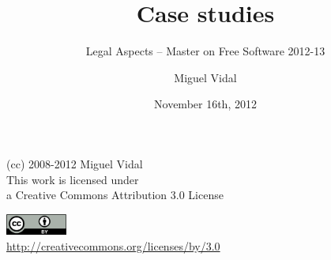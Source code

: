 \documentclass{beamer}
\begin{document}
\title{Case studies}
\subtitle{Legal Aspects -- Master on Free Software 2012-13}
\author{Miguel Vidal} 
\date{November 16th, 2012}



\begin{frame}
  \vspace{2cm}
  \begin{flushright}
    {\small (cc) 2008-2012 Miguel Vidal} \\
    \medskip
    {\scriptsize This work is licensed under \\ a Creative Commons Attribution 3.0 License}
  \end{flushright}
  \begin{flushright}
    \href{http://creativecommons.org/licenses/by/3.0}{\includegraphics[width=2cm]{format/cc-by.png}} \\
    {\tiny \url{http://creativecommons.org/licenses/by/3.0}}
  \end{flushright}
\end{frame}%

\usebackgroundtemplate{}

\end{document}
